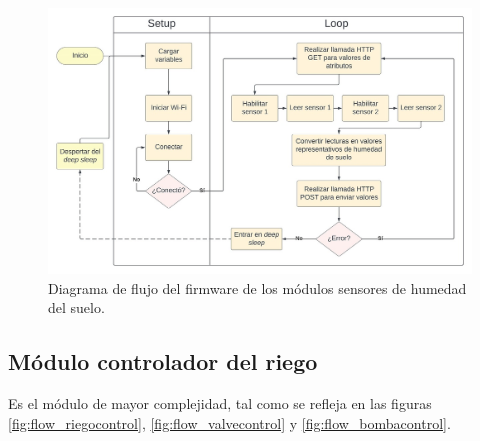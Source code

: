 \begin{figure}[!h]
	\centering
	\includegraphics[width=1\textwidth]{./Figures/chapter3/FirmwareSoilSensor.jpg}
	\caption[Diagrama de flujo del firmware de los módulos sensores de humedad del suelo]{Diagrama de flujo del firmware de los módulos sensores de humedad del suelo.}
	\label{fig:flow_soilsensor}
\end{figure}



\subsection{Módulo controlador del riego}
\label{Firmware módulo controlador del riego}

Es el módulo de mayor complejidad, tal como se refleja en las figuras \ref{fig:flow_riegocontrol}, \ref{fig:flow_valvecontrol}  y \ref{fig:flow_bombacontrol}.

